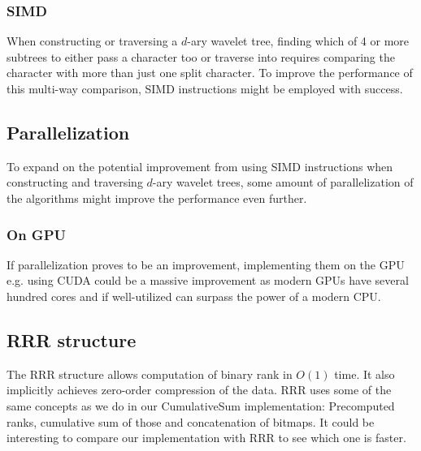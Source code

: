 \subsubsection{SIMD}
When constructing or traversing a $d$-ary wavelet tree, finding which of 4 or more subtrees to either pass a character too or traverse into requires comparing the character with more than just one split character.
To improve the performance of this multi-way comparison, SIMD instructions might be employed with success.


\subsection{Parallelization}
To expand on the potential improvement from using SIMD instructions when constructing and traversing $d$-ary wavelet trees, some amount of parallelization of the algorithms might improve the performance even further.
\subsubsection{On GPU}
If parallelization proves to be an improvement, implementing them on the GPU e.g. using CUDA could be a massive improvement as modern GPUs have several hundred cores and if well-utilized can surpass the power of a modern CPU.

\subsection{RRR structure}
The RRR structure allows computation of binary rank in $O(1)$ time. 
It also implicitly achieves zero-order compression of the data.
RRR uses some of the same concepts as we do in our CumulativeSum implementation: Precomputed ranks, cumulative sum of those and concatenation of bitmaps.
It could be interesting to compare our implementation with RRR to see which one is faster.

